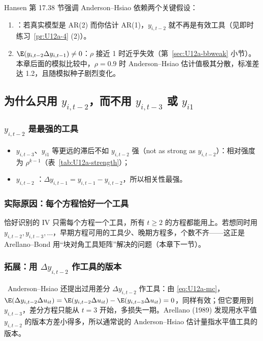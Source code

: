 Hansen 第 17.38 节强调 Anderson–Hsiao 依赖两个关键假设：
\begin{enumerate}
  \item {}：若真实模型是 AR(2) 而你估计 AR(1)，$y_{i,t-2}$ 就不再是有效工具（见即时练习~\ref{pr:U12a-4} (2)）。
  \item {} $\E(y_{i,t-2}\Delta y_{i,t-1})\neq0$：$\rho$ 接近 1 时近乎失效（第~\ref{sec:U12a-bbweak} 小节）。本章后面的模拟比较中，$\rho=0.9$ 时 Anderson–Hsiao 估计值极其分散，标准差达 1.2，且随模拟种子剧烈变化。
\end{enumerate}

\subsection{为什么只用 \texorpdfstring{$y_{i,t-2}$}{y\_(i,t-2)}，而不用 \texorpdfstring{$y_{i,t-3}$}{y\_(i,t-3)} 或 \texorpdfstring{$y_{i1}$}{y\_i1}}

\subsubsection{\texorpdfstring{$y_{i,t-2}$}{y\_(i,t-2)} 是最强的工具}

\begin{itemize}
  \item $y_{i,t-3}$、$y_{i1}$ 等更远的滞后不如 $y_{i,t-2}$ 强（not as strong as $y_{i,t-2}$）：相对强度为 $\rho^{k-1}$（表~\ref{tab:U12a-strength}）；
  \item $y_{i,t-2}$ ：$\Delta y_{i,t-1}=y_{i,t-1}-y_{i,t-2}$，所以相关性最强。
\end{itemize}

\subsubsection{实际原因：每个方程恰好一个工具}

恰好识别的 IV 只需每个方程一个工具，所有 $t\ge2$ 的方程都能用上。若想同时用 $y_{i,t-2},y_{i,t-3},\dots$，早期方程可用的工具少、晚期方程多，个数不齐——这正是 Arellano–Bond 用“块对角工具矩阵”解决的问题（本章下一节）。

\subsubsection{拓展：用 \texorpdfstring{$\Delta y_{i,t-2}$}{Delta y\_(i,t-2)} 作工具的版本}

\tagext\ Anderson–Hsiao 还提出过用差分 $\Delta y_{i,t-2}$ 作工具：由 \eqref{eq:U12a-mc}，$\E(\Delta y_{i,t-2}\Delta u_{it})=\E(y_{i,t-2}\Delta u_{it})-\E(y_{i,t-3}\Delta u_{it})=0$，同样有效；但它要用到 $y_{i,t-3}$，差分方程只能从 $t=3$ 开始，多损失一期。Arellano (1989) 发现用水平值 $y_{i,t-2}$ 的版本方差小得多，所以通常说的 Anderson–Hsiao 估计量指水平值工具的版本。


